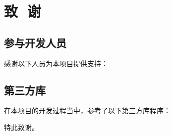 \chapter{致\,\,\,\,谢}

\section{参与开发人员}

感谢以下人员为本项目提供支持：


\section{第三方库}

在本项目的开发过程当中，参考了以下第三方库程序：


特此致谢。